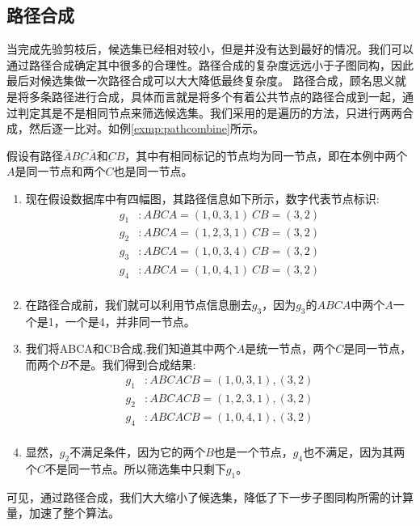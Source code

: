 \documentclass{XDBAthesis}
\numberwithin{algorithm}{chapter}
\begin{document}
\subsection{路径合成}
当完成先验剪枝后，候选集已经相对较小，但是并没有达到最好的情况。我们可以通过路径合成确定其中很多的合理性。路径合成的复杂度远远小于子图同构，因此最后对候选集做一次路径合成可以大大降低最终复杂度。
路径合成，顾名思义就是将多条路径进行合成，具体而言就是将多个有着公共节点的路径合成到一起，通过判定其是不是相同节点来筛选候选集。我们采用的是遍历的方法，只进行两两合成，然后逐一比对。如例\ref{exmp:pathcombine}所示。
\begin{exmp}
    假设有路径$\bar{A}B\underbar{C}\bar{A} $和$\underbar{C}B$，其中有相同标记的节点均为同一节点，即在本例中两个$A$是同一节点和两个$C$也是同一节点。
    \label{exmp:pathcombine}
    \begin{enumerate}
        \item 现在假设数据库中有四幅图，其路径信息如下所示，数字代表节点标识:
        $$
        \begin{aligned}
            g_1 &:ABCA={(1,0,3,1)}\ CB={(3,2)}\\
            g_2 &:ABCA={(1,2,3,1)}\ CB={(3,2)}\\
            g_3 &:ABCA={(1,0,3,4)}\ CB={(3,2)}\\
            g_4 &:ABCA={(1,0,4,1)}\ CB={(3,2)}\\
        \end{aligned}
        $$
        \item 在路径合成前，我们就可以利用节点信息删去$g_3$，因为$g_3$的$ABCA$中两个$A$一个是1，一个是4，并非同一节点。
        \item 我们将ABCA和CB合成,我们知道其中两个$A$是统一节点，两个$C$是同一节点，而两个$B$不是。我们得到合成结果:
        $$
        \begin{aligned}
            g_1 &:ABCACB={(1,0,3,1),(3,2)}\\
            g_2 &:ABCACB={(1,2,3,1),(3,2)}\\
            g_4 &:ABCACB={(1,0,4,1),(3,2)}\\
        \end{aligned}
        $$
        \item  显然，$g_2$不满足条件，因为它的两个$B$也是一个节点，$g_4$也不满足，因为其两个$C$不是同一节点。所以筛选集中只剩下$g_1$。
    \end{enumerate}    
\end{exmp}
可见，通过路径合成，我们大大缩小了候选集，降低了下一步子图同构所需的计算量，加速了整个算法。
\end{document}
